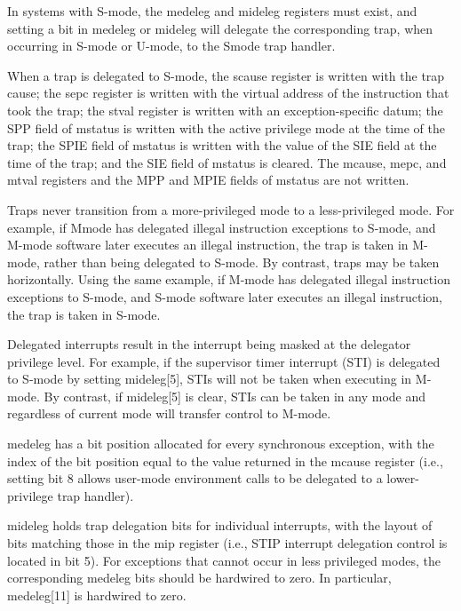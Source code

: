 \documentclass[../main.tex]{subfiles}
\begin{document}
\begin{itemize}
\begin{itemize}
            In systems with S-mode, the medeleg and mideleg registers must exist, and setting a bit in medeleg
            or mideleg will delegate the corresponding trap, when occurring in S-mode or U-mode, to the Smode trap handler.
            
            When a trap is delegated to S-mode, the scause register is written with the trap cause; the sepc
            register is written with the virtual address of the instruction that took the trap; the stval register
            is written with an exception-specific datum; the SPP field of mstatus is written with the active
            privilege mode at the time of the trap; the SPIE field of mstatus is written with the value of the
            SIE field at the time of the trap; and the SIE field of mstatus is cleared. The mcause, mepc, and
            mtval registers and the MPP and MPIE fields of mstatus are not written.
            
            Traps never transition from a more-privileged mode to a less-privileged mode. For example, if Mmode has delegated illegal instruction exceptions to S-mode, and M-mode software later executes
            an illegal instruction, the trap is taken in M-mode, rather than being delegated to S-mode. By
            contrast, traps may be taken horizontally. Using the same example, if M-mode has delegated illegal
            instruction exceptions to S-mode, and S-mode software later executes an illegal instruction, the trap
            is taken in S-mode.
            
            Delegated interrupts result in the interrupt being masked at the delegator privilege level. For
            example, if the supervisor timer interrupt (STI) is delegated to S-mode by setting mideleg[5], STIs
            will not be taken when executing in M-mode. By contrast, if mideleg[5] is clear, STIs can be taken
            in any mode and regardless of current mode will transfer control to M-mode.
            
            
            medeleg has a bit position allocated for every synchronous exception,
            with the index of the bit position equal to the value returned in the mcause register (i.e., setting
            bit 8 allows user-mode environment calls to be delegated to a lower-privilege trap handler).
            
            mideleg holds trap delegation bits for individual interrupts, with the layout of bits matching those
            in the mip register (i.e., STIP interrupt delegation control is located in bit 5).
            For exceptions that cannot occur in less privileged modes, the corresponding medeleg bits should
            be hardwired to zero. In particular, medeleg[11] is hardwired to zero.\\
			

\end{itemize}
\end{itemize}
\end{document}
